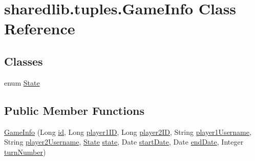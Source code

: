 \hypertarget{classsharedlib_1_1tuples_1_1_game_info}{}\section{sharedlib.\+tuples.\+Game\+Info Class Reference}
\label{classsharedlib_1_1tuples_1_1_game_info}
\subsection*{Classes}
\begin{DoxyCompactItemize}
\item 
enum \hyperlink{enumsharedlib_1_1tuples_1_1_game_info_1_1_state}{State}
\end{DoxyCompactItemize}
\subsection*{Public Member Functions}
\begin{DoxyCompactItemize}
\item 
\hyperlink{classsharedlib_1_1tuples_1_1_game_info_ae481f1247dcb371c2fe48b372cb84219}{Game\+Info} (Long \hyperlink{classsharedlib_1_1tuples_1_1_game_info_a26ad60530e62a05f87c0703818898ebe}{id}, Long \hyperlink{classsharedlib_1_1tuples_1_1_game_info_af5d977e3c705e0db8a0ab8dec4f353ed}{player1\+ID}, Long \hyperlink{classsharedlib_1_1tuples_1_1_game_info_aa3a82b92a42c7b61c18e2a214bc5a099}{player2\+ID}, String \hyperlink{classsharedlib_1_1tuples_1_1_game_info_a89da4ca1f9dd359190862a3aae14bdbe}{player1\+Username}, String \hyperlink{classsharedlib_1_1tuples_1_1_game_info_ad5af3fd8e58b7bdb34326ec50accf0e6}{player2\+Username}, \hyperlink{enumsharedlib_1_1tuples_1_1_game_info_1_1_state}{State} \hyperlink{classsharedlib_1_1tuples_1_1_game_info_afc333badb334883013fd65eeb7d4fd80}{state}, Date \hyperlink{classsharedlib_1_1tuples_1_1_game_info_abb7d07e4ce3a419b45134234b312d4a3}{start\+Date}, Date \hyperlink{classsharedlib_1_1tuples_1_1_game_info_a36b010041256c5e2e1d006ef2c6edf68}{end\+Date}, Integer \hyperlink{classsharedlib_1_1tuples_1_1_game_info_a71de1ad6ea2bfc9eb4b498c57b04c55c}{turn\+Number})
\end{DoxyCompactItemize}
